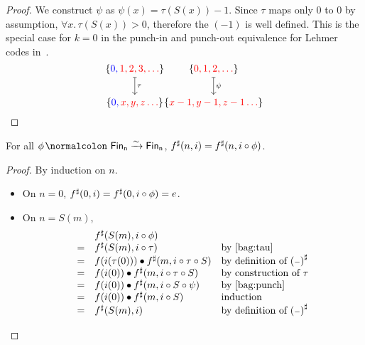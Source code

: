\begin{proof}
    We construct $\psi$ as $\psi(x) = \tau(S(x)) - 1$.
    Since $\tau$ maps only 0 to 0 by assumption, $\forall x. \, \tau(S(x)) > 0$, therefore
    the $(- 1)$ is well defined. This is the special case for $k = 0$ in the punch-in and punch-out
    equivalence for Lehmer codes in~\cite{choudhurySymmetriesReversibleProgramming2022}.
    \[
        \begin{tikzcd}[ampersand replacement=\&,cramped]
            {\{\color{blue}0, \color{red}1, 2, 3, \dots \color{black}\}} \\
            { \{\color{blue}0, \color{red} x, y, z \dots \color{black}\}}
            \arrow["\tau", maps to, from=1-1, to=2-1]
        \end{tikzcd}
        \\
        \begin{tikzcd}[ampersand replacement=\&,cramped]
            {\{\color{red}0, 1, 2, \dots \color{black}\}} \\
            { \{\color{red} x-1, y-1, z-1 \dots \color{black}\}}
            \arrow["\psi", maps to, from=1-1, to=2-1]
        \end{tikzcd}
    \]
\end{proof}

\begin{theorem}\label{bag:perm-sat}
    For all $\phi\colon \Fin[n]\xto{\sim}\Fin[n]$, $\ext{f}(n, i) \id \ext{f}(n, i \circ \phi)$.
\end{theorem}

\begin{proof}
    By induction on $n$.
    \begin{itemize}
        \item On $n = 0$, $\ext{f}(0, i) \id \ext{f}(0, i \circ \phi) = e$.
        \item On $n = S(m)$,
              \[
                  \begin{array}{rll}
                        & \ext{f}(S(m), i \circ \phi)                          &                                          \\
                      = & \ext{f}(S(m), i \circ \tau)                          & \text{by~\cref{bag:tau}}                 \\
                      = & f(i(\tau(0))) \mult \ext{f}(m, i \circ \tau \circ S) & \text{by definition of $\ext{(\blank)}$} \\
                      = & f(i(0)) \mult \ext{f}(m, i \circ \tau \circ S)       & \text{by construction of $\tau$}         \\
                      = & f(i(0)) \mult \ext{f}(m, i \circ S \circ \psi)       & \text{by~\cref{bag:punch}}               \\
                      = & f(i(0)) \mult \ext{f}(m, i \circ S)                  & \text{induction}                         \\
                      = & \ext{f}(S(m), i)                                     & \text{by definition of $\ext{(\blank)}$}
                  \end{array}
              \]
    \end{itemize}
\end{proof}

